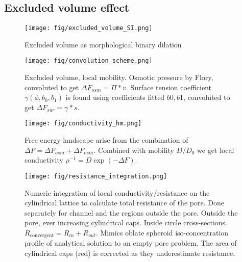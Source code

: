 \documentclass[10pt, a4paper]{article}
\begin{document}
\subsection*{Excluded volume effect}

\begin{figure}
    \centering
    \texttt{[image: fig/excluded\_volume\_SI.png]}
    \caption{
        Excluded volume as morphological binary dilation
        }
    \label{fig:excluded_volume}
\end{figure}

\begin{figure}
    \centering
    \texttt{[image: fig/convolution\_scheme.png]}
    \caption{
        Excluded volume, local mobility. 
        Osmotic pressure by Flory, convoluted to get $\Delta F_{osm} = \Pi \ast v$. Surface tension coefficient $\gamma(\phi, b_0, b_1)$ is found using coefficients fitted $b0, b1$, convoluted to get $\Delta F_{sur} = \gamma \ast s$.
        }
    \label{fig:convolution_scheme}
\end{figure}

\begin{figure}
    \centering
    \texttt{[image: fig/conductivity\_hm.png]}
    \caption{
        Free energy landscape arise from the combination of $\Delta F = \Delta F_{osm} + \Delta F_{osm}$. Combined with mobility $D/D_0$ we get local conductivity $\rho^{-1} = D \exp (-\Delta F)$.
        }
    \label{fig:conductivity_hm}
\end{figure}


\begin{figure}
    \centering
    \texttt{[image: fig/resistance\_integration.png]}
    \caption{
        Numeric integration of local conductivity/resistance on the cylindrical lattice to calculate total resistance of the pore. 
        Done separately for channel and the regions outside the pore.
        Outside the pore, ever increasing cylindrical caps.
        Inside circle cross-sections. $R_{\textrm{convergent}} = R_{in} + R_{out}$.
        Mimics oblate spheroid iso-concentration profile of analytical solution to an empty pore problem.
        The area of cylindrical caps (red) is corrected as they underestimate resistance.
        }
    \label{fig:integration_scheme}
\end{figure}
\end{document}
